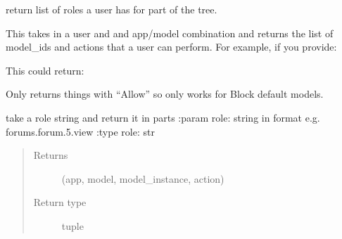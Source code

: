 \documentclass[letterpaper,10pt,english]{sphinxmanual}
\begin{document}
\begin{fulllineitems}
\label{\detokenize{rbac:rbac.core.rbac_user_role_list}}
return list of roles a user has for part of the tree.

This takes in a user and and app/model combination and returns the list of
model\_ids and actions that a user can perform. For example, if you provide:

\begin{sphinxVerbatim}[commandchars=\\\{\}]
  
  
\end{sphinxVerbatim}

This could return:

\begin{sphinxVerbatim}[commandchars=\\\{\}]
\PYG{p}{[}     \PYG{p}{]}
\end{sphinxVerbatim}

Only returns things with “Allow” so only works for Block default models.

\end{fulllineitems}


\begin{fulllineitems}
\label{\detokenize{rbac:rbac.core.role_to_parts}}
take a role string and return it in parts
:param role: string in format e.g. forums.forum.5.view
:type role: str
\begin{quote}\begin{description}
\item[{Returns}] \leavevmode
(app, model, model\_instance, action)

\item[{Return type}] \leavevmode
tuple

\end{description}\end{quote}

\end{fulllineitems}
\end{document}
